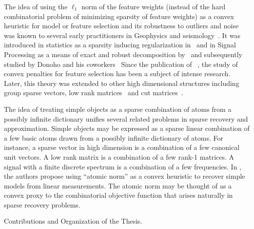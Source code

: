 The idea of using the $\ell_1$ norm of the feature weights (instead of the hard
combinatorial problem of minimizing sparsity of feature weights) as a convex
heuristic for model or feature selection and its robustness to outliers and
noise was known to several early practitioners in Geophysics and
seismology~\cite{claerbout:robust,taylor:deconvolution,levy:spike-train,santosa}.
It was introduced in statistics as a sparsity inducing regularization
in~\cite{tibshirani96} and in Signal Processing as a means of exact and robust
decomposition by~\cite{chen98} and subsequently studied by Donoho and his
coworkers~\cite{donoho:huo,spark} Since the publication of
~\cite{CRT06,meinshausen:variable-selection}, the study of convex penalties for
feature selection has been a subject of intense research. Later, this theory was extended to other high dimensional structures including group sparse vectors\cite{group:lasso}, low rank matrices~\cite{recht07} and cut matrices~\cite{cut:goemans}.


The idea of treating simple objects as a sparse combination of atoms from a
possibly infinite dictionary unifies several related problems in sparse
recovery and approximation. Simple objects may be expressed as a sparse linear
combination of a few basic atoms drawn from a possibly infinite dictionary of
atoms. For instance, a sparse vector in high dimension is a combination of a
few canonical unit vectors. A low rank matrix is a combination of a few rank-1
matrices. A signal with a finite discrete spectrum is a combination of a few
frequencies.  In \cite{crpw}, the authors propose using ``atomic norm'' as a
convex heuristic to recover simple models from linear measurements. The atomic
norm may be thought of as a convex proxy to the combinatorial objective
function that arises naturally in sparse recovery problems.
\\



Contributions and Organization of the Thesis.